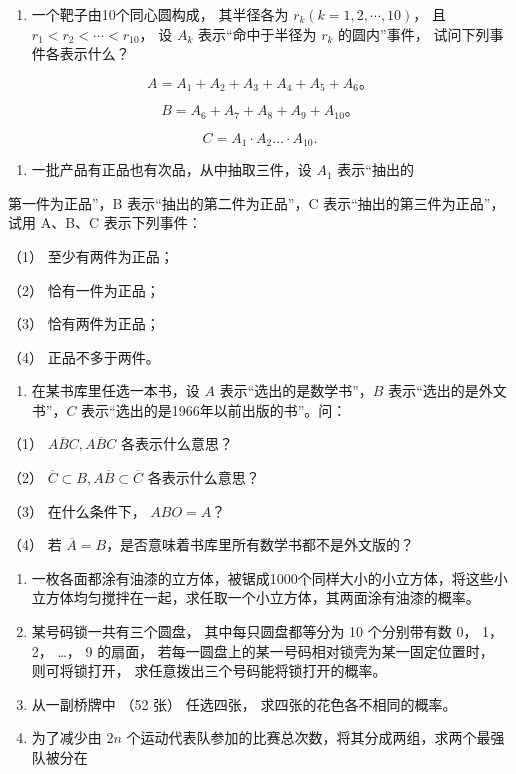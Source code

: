 \begin{enumerate}
\item
  一个靶子由10个同心圆构成， 其半径各为 \(r_k (k=1,2,\cdots,10)\)， 且
  \(r_1 < r_2 < \cdots < r_{10}\)， 设 \(A_k\) 表示``命中于半径为
  \(r_k\) 的圆内''事件， 试问下列事件各表示什么？
\end{enumerate}

\[
A=A_1+A_2+A_3+A_4+A_5+A_6\text{。}
\]

\[
B=A_6+A_7+A_8+A_9+A_{10}\text{。}
\]

\[
C = A _ {1} \cdot A _ {2} \dots \cdot A _ {10}.
\]

\begin{enumerate}[start=2]
\item
  一批产品有正品也有次品，从中抽取三件，设 \(A_{1}\) 表示``抽出的
\end{enumerate}

第一件为正品''，B 表示``抽出的第二件为正品''，C
表示``抽出的第三件为正品''，试用 A、B、C 表示下列事件：

（1） 至少有两件为正品；

（2） 恰有一件为正品；

（3） 恰有两件为正品；

（4） 正品不多于两件。

\begin{enumerate}[start=3]
\item
  在某书库里任选一本书，设 \(A\) 表示``选出的是数学书''，\(B\)
  表示``选出的是外文书''，\(C\) 表示``选出的是1966年以前出版的书''。问：
\end{enumerate}

（1） \(A \overline{B} C, A \overline{B} C\) 各表示什么意思？

（2） \(\overline{C} \subset B, A\overline{B} \subset \overline{C}\)
各表示什么意思？

（3） 在什么条件下， \(ABO = A\)？

（4） 若
\(\overline{A} = B\)，是否意味着书库里所有数学书都不是外文版的？

\begin{enumerate}[start=4]
\item
  一枚各面都涂有油漆的立方体，被锯成1000个同样大小的小立方体，将这些小立方体均匀搅拌在一起，求任取一个小立方体，其两面涂有油漆的概率。
\item
  某号码锁一共有三个圆盘， 其中每只圆盘都等分为 10 个分别带有数 0， 1，
  2， \ldots， 9 的扇面，
  若每一圆盘上的某一号码相对锁壳为某一固定位置时， 则可将锁打开，
  求任意拨出三个号码能将锁打开的概率。
\item
  从一副桥牌中 （52 张） 任选四张， 求四张的花色各不相同的概率。
\item
  为了减少由 \(2n\)
  个运动代表队参加的比赛总次数，将其分成两组，求两个最强队被分在
\end{enumerate}

